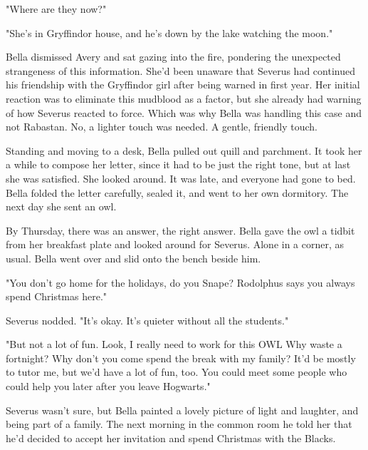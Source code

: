 "Where are they now?"

"She's in Gryffindor house, and he's down by the lake watching the moon."

Bella dismissed Avery and sat gazing into the fire, pondering the unexpected strangeness of this information. She'd been unaware that Severus had continued his friendship with the Gryffindor girl after being warned in first year. Her initial reaction was to eliminate this mudblood as a factor, but she already had warning of how Severus reacted to force. Which was why Bella was handling this case and not Rabastan. No, a lighter touch was needed. A gentle, friendly touch.

Standing and moving to a desk, Bella pulled out quill and parchment. It took her a while to compose her letter, since it had to be just the right tone, but at last she was satisfied. She looked around. It was late, and everyone had gone to bed. Bella folded the letter carefully, sealed it, and went to her own dormitory. The next day she sent an owl.

By Thursday, there was an answer, the right answer. Bella gave the owl a tidbit from her breakfast plate and looked around for Severus. Alone in a corner, as usual. Bella went over and slid onto the bench beside him.

"You don't go home for the holidays, do you Snape? Rodolphus says you always spend Christmas here."

Severus nodded. "It's okay. It's quieter without all the students."

"But not a lot of fun. Look, I really need to work for this OWL Why waste a fortnight? Why don't you come spend the break with my family? It'd be mostly to tutor me, but we'd have a lot of fun, too. You could meet some people who could help you later after you leave Hogwarts."

Severus wasn't sure, but Bella painted a lovely picture of light and laughter, and being part of a family. The next morning in the common room he told her that he'd decided to accept her invitation and spend Christmas with the Blacks.


